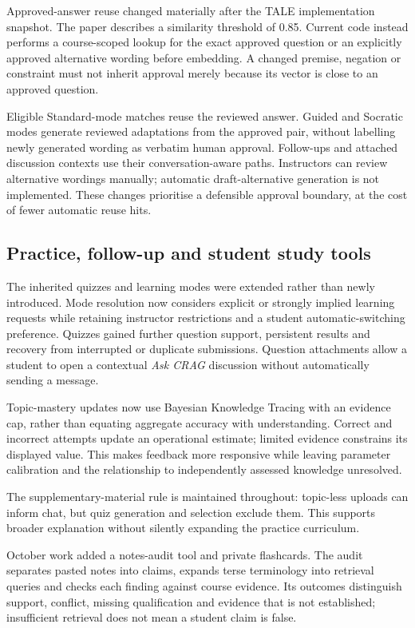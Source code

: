 \documentclass[11pt,a4paper]{article}
\begin{document}
Approved-answer reuse changed materially after the TALE implementation snapshot. The paper describes a similarity threshold of 0.85. Current code instead performs a course-scoped lookup for the exact approved question or an explicitly approved alternative wording before embedding. A changed premise, negation or constraint must not inherit approval merely because its vector is close to an approved question.

Eligible Standard-mode matches reuse the reviewed answer. Guided and Socratic modes generate reviewed adaptations from the approved pair, without labelling newly generated wording as verbatim human approval. Follow-ups and attached discussion contexts use their conversation-aware paths. Instructors can review alternative wordings manually; automatic draft-alternative generation is not implemented. These changes prioritise a defensible approval boundary, at the cost of fewer automatic reuse hits.

\subsection{Practice, follow-up and student study tools}
The inherited quizzes and learning modes were extended rather than newly introduced. Mode resolution now considers explicit or strongly implied learning requests while retaining instructor restrictions and a student automatic-switching preference. Quizzes gained further question support, persistent results and recovery from interrupted or duplicate submissions. Question attachments allow a student to open a contextual \emph{Ask CRAG} discussion without automatically sending a message.

Topic-mastery updates now use Bayesian Knowledge Tracing with an evidence cap, rather than equating aggregate accuracy with understanding. Correct and incorrect attempts update an operational estimate; limited evidence constrains its displayed value. This makes feedback more responsive while leaving parameter calibration and the relationship to independently assessed knowledge unresolved.

The supplementary-material rule is maintained throughout: topic-less uploads can inform chat, but quiz generation and selection exclude them. This supports broader explanation without silently expanding the practice curriculum.

October work added a notes-audit tool and private flashcards. The audit separates pasted notes into claims, expands terse terminology into retrieval queries and checks each finding against course evidence. Its outcomes distinguish support, conflict, missing qualification and evidence that is not established; insufficient retrieval does not mean a student claim is false.
\end{document}

